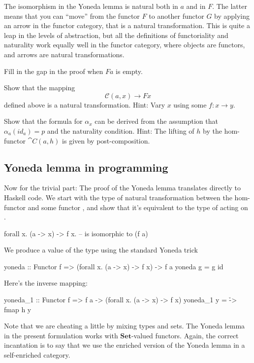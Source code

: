 \documentclass[DaoFP]{subfiles}
\begin{document}
The isomorphism in the Yoneda lemma is natural both in $a$ and in $F$. The latter means that you can ``move'' from the functor $F$ to another functor $G$ by applying an arrow in the functor category, that is a natural transformation. This is quite a leap in the levels of abstraction, but all the definitions of functoriality and naturality work equally well in the functor category, where objects are functors, and arrows are natural transformations.

\begin{exercise}
Fill in the gap in the proof when $F a$ is empty.
\end{exercise}
\begin{exercise}
Show that the mapping 
\[ \mathcal{C}(a, x) \to F x\]
defined above is a natural transformation. Hint: Vary $x$ using some $f \colon x \to y$.
\end{exercise}
\begin{exercise}
Show that the formula for $\alpha_x$ can be derived from the assumption that $\alpha_a (id_a) = p$ and the naturality condition. Hint: The lifting of $h$ by the hom-functor $\cat C(a, h)$ is given by post-composition.
\end{exercise}

\subsection{Yoneda lemma in programming}

Now for the trivial part: The proof of the Yoneda lemma translates directly to Haskell code. We start with the type of natural transformation between the hom-functor  and some functor , and show that it's equivalent to the type of  acting on .
\begin{haskell}
forall x. (a -> x) -> f x.   -- is isomorphic to (f a)
\end{haskell}
We produce a value of the type  using the standard Yoneda trick
\begin{haskell}
yoneda :: Functor f => (forall x. (a -> x) -> f x) -> f a
yoneda g = g id
\end{haskell}
Here's the inverse mapping:
\begin{haskell}
yoneda_1 :: Functor f => f a -> (forall x. (a -> x) -> f x)
yoneda_1 y = \h -> fmap h y
\end{haskell}

Note that we are cheating a little by mixing types and sets. The Yoneda lemma in the present formulation works with  $\mathbf{Set}$-valued functors. Again, the correct incantation is to say that we use the enriched version of the Yoneda lemma in a self-enriched category.
\end{document}

